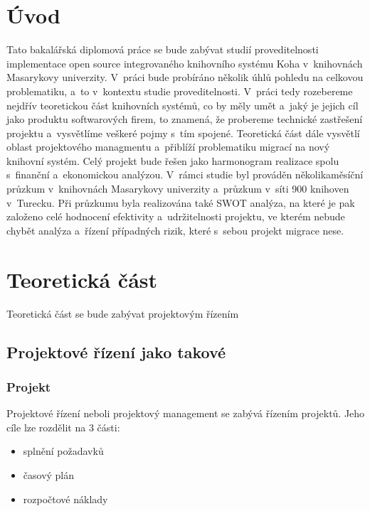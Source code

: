 \documentclass[
	11pt, oneside, printed, final, palatino, monochrome
	microtype,
	table,   %
	lof,     %
	lot     %
]{fithesis3}
\newcommand{\mezera}{\bigskip}
\begin{document}
{%

\chapter*{Úvod}
Tato bakalářská diplomová práce se bude zabývat studií proveditelnosti implementace open source integrovaného knihovního systému Koha v~knihovnách Masarykovy univerzity. V~práci bude probíráno několik úhlů pohledu na celkovou problematiku, a~to v~kontextu studie proveditelnosti.  V~práci tedy rozebereme nejdřív teoretickou část knihovních systémů, co by měly umět a~jaký je jejich cíl jako produktu softwarových firem, to znamená, že probereme technické zastřešení projektu a~vysvětlíme veškeré pojmy s~tím spojené. Teoretická část dále vysvětlí oblast projektového managmentu a~přiblíží problematiku migrací na nový knihovní systém. Celý projekt bude řešen jako harmonogram realizace spolu s~finanční a~ekonomickou analýzou. V~rámci studie byl prováděn několikaměsíční průzkum v~knihovnách Masarykovy univerzity a~průzkum v~síti 900 knihoven v~Turecku. Při průzkumu byla realizována také SWOT analýza, na které je pak založeno celé hodnocení efektivity a~udržitelnosti projektu, ve kterém nebude chybět analýza a~řízení případných rizik, které s~sebou projekt migrace nese.

\chapter{Teoretická část}

Teoretická část se bude zabývat projektovým řízením 

\section{Projektové řízení jako takové} \label{sec:projektove_rizeni_jako_takove}

\subsection{Projekt}

Projektové řízení neboli projektový management se zabývá řízením projektů. Jeho cíle lze rozdělit na 3 části: 
\mezera
\begin{itemize}
\item splnění požadavků
\item časový plán
\item rozpočtové náklady
\end{itemize}

}
\end{document}
